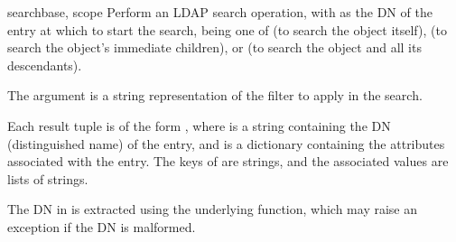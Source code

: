 \begin{methoddesc}[LDAPObject]{search}{base, scope } %
Perform an LDAP search operation, with  as the DN of the entry
at which to start the search,  being one of 
 (to search the object itself), 
 (to search the object's immediate children), or
 (to search the object and all its descendants).

The
 argument is a string representation of the filter to apply in
the search.

\begin{seealso}
\end{seealso}

Each result tuple is of the form , 
where  is a string containing the DN (distinguished name) of the
entry, and  is a dictionary containing the attributes associated
with the entry. The keys of  are strings, and the associated
values are lists of strings.

The DN in  is extracted using the underlying 
function,
which may raise an exception if the DN is malformed.


\end{methoddesc}
